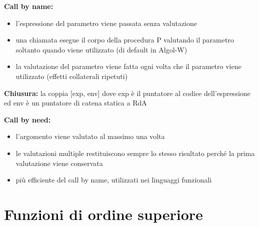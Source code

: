 \documentclass{article}
\begin{document}
\begin{flushleft}
\begin{itemize}
\end{itemize}

\medskip

\textbf{Call by name:} \\
\begin{itemize}
    \item l'espressione del parametro viene passata senza valutazione
    \item una chiamata esegue il corpo della procedura P valutando il parametro soltanto quando viene utilizzato (di default in Algol-W)
    \item la valutazione del parametro viene fatta ogni volta che il parametro viene utilizzato (effetti collaterali ripetuti)
\end{itemize}

\medskip

\textbf{Chiusura:} la coppia [exp, env] dove exp è il puntatore al codice dell'espressione ed env è un puntatore di catena statica a RdA \\

\medskip

\textbf{Call by  need:}
\begin{itemize}
    \item l'argomento viene valutato al massimo una volta
    \item le valutazioni multiple restituiscono sempre lo stesso risultato perché la prima valutazione viene conservata
    \item più efficiente del call by name, utilizzati nei linguaggi funzionali
\end{itemize}

\medskip

\end{flushleft}
 

\section*{Funzioni di ordine superiore}
\end{document}

